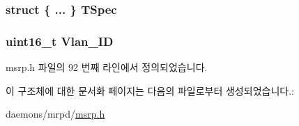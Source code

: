 \subsubsection[{\texorpdfstring{T\+Spec}{TSpec}}]{\setlength{\rightskip}{0pt plus 5cm}struct \{ ... \}   T\+Spec}\hypertarget{structmsrpdu__talker__fail_a93b4d8a68a100778d9f7c6ee205919cf}{}\label{structmsrpdu__talker__fail_a93b4d8a68a100778d9f7c6ee205919cf}
\subsubsection[{\texorpdfstring{Vlan\+\_\+\+ID}{Vlan_ID}}]{\setlength{\rightskip}{0pt plus 5cm}uint16\+\_\+t Vlan\+\_\+\+ID}\hypertarget{structmsrpdu__talker__fail_a4120c111980bfa76de9f4f91bd57d40a}{}\label{structmsrpdu__talker__fail_a4120c111980bfa76de9f4f91bd57d40a}


msrp.\+h 파일의 92 번째 라인에서 정의되었습니다.



이 구조체에 대한 문서화 페이지는 다음의 파일로부터 생성되었습니다.\+:\begin{DoxyCompactItemize}
\item 
daemons/mrpd/\hyperlink{msrp_8h}{msrp.\+h}\end{DoxyCompactItemize}
